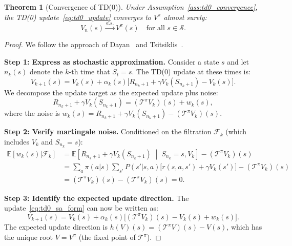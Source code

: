 \documentclass[11pt,a4paper]{article}
\theoremstyle{definition}
\theoremstyle{plain}
\newtheorem{theorem}{Theorem}[section]
\theoremstyle{remark}
\newcommand{\E}{\mathbb{E}}
\begin{document}
\begin{keyresult}[Convergence of TD(0)]
\begin{theorem}[Convergence of TD(0)]
\label{thm:td0_convergence}
Under Assumption~\ref{ass:td0_convergence}, the TD(0) update~\eqref{eq:td0_update} converges to $V^\pi$ almost surely:
\begin{equation}
    V_n(s) \xrightarrow{a.s.} V^\pi(s) \quad \text{for all } s \in \mathcal{S}.
\end{equation}
\end{theorem}
\end{keyresult}

\begin{proof}
We follow the approach of Dayan~\cite{dayan1992} and Tsitsiklis~\cite{tsitsiklis1994}.

\textbf{Step 1: Express as stochastic approximation.} Consider a state $s$ and let $n_k(s)$ denote the $k$-th time that $S_t = s$. The TD(0) update at these times is:
\begin{equation}
    V_{k+1}(s) = V_k(s) + \alpha_k(s)\bigl[R_{n_k+1} + \gamma V_k(S_{n_k+1}) - V_k(s)\bigr].
    \label{eq:td0_sa_form}
\end{equation}
We decompose the update target as the expected update plus noise:
\begin{equation}
    R_{n_k+1} + \gamma V_k(S_{n_k+1}) = (\mathcal{T}^\pi V_k)(s) + w_k(s),
    \label{eq:td0_decomp}
\end{equation}
where the noise is $w_k(s) = R_{n_k+1} + \gamma V_k(S_{n_k+1}) - (\mathcal{T}^\pi V_k)(s)$.

\textbf{Step 2: Verify martingale noise.} Conditioned on the filtration $\mathcal{F}_k$ (which includes $V_k$ and $S_{n_k} = s$):
\begin{align}
    \E[w_k(s) | \mathcal{F}_k]
    &= \E\!\left[R_{n_k+1} + \gamma V_k(S_{n_k+1}) \;\middle|\; S_{n_k} = s, V_k\right] - (\mathcal{T}^\pi V_k)(s) \nonumber\\
    &= \sum_a \pi(a|s) \sum_{s'} P(s'|s,a)\bigl[r(s,a,s') + \gamma V_k(s')\bigr] - (\mathcal{T}^\pi V_k)(s) \nonumber\\
    &= (\mathcal{T}^\pi V_k)(s) - (\mathcal{T}^\pi V_k)(s) = 0. \label{eq:td0_noise_mg}
\end{align}

\textbf{Step 3: Identify the expected update direction.} The update~\eqref{eq:td0_sa_form} can now be written as:
\begin{equation}
    V_{k+1}(s) = V_k(s) + \alpha_k(s)\bigl[(\mathcal{T}^\pi V_k)(s) - V_k(s) + w_k(s)\bigr].
    \label{eq:td0_sa_clean}
\end{equation}
The expected update direction is $h(V)(s) = (\mathcal{T}^\pi V)(s) - V(s)$, which has the unique root $V = V^\pi$ (the fixed point of $\mathcal{T}^\pi$).


\end{proof}
\end{document}
